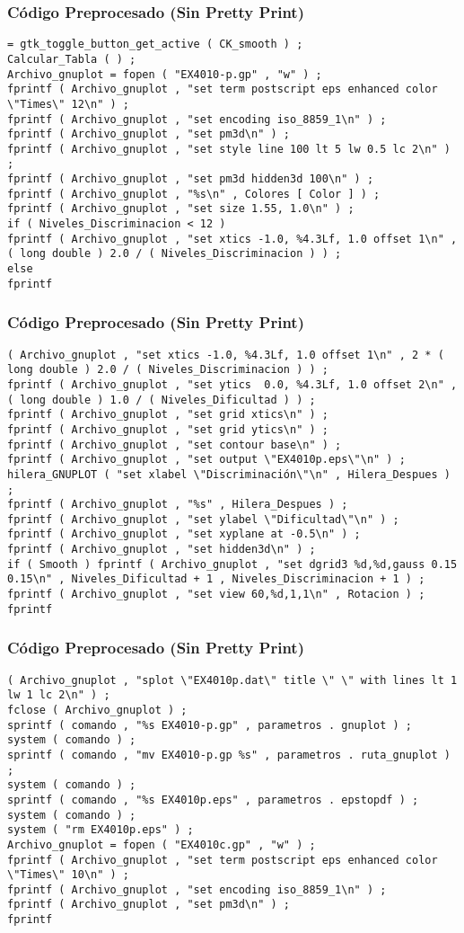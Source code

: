 \documentclass{beamer}
\begin{document}
\begin{frame}[fragile]
\frametitle{C\'odigo Preprocesado (Sin Pretty Print)}
\begin{lstlisting}[style=CStyle]
= gtk_toggle_button_get_active ( CK_smooth ) ; 
Calcular_Tabla ( ) ; 
Archivo_gnuplot = fopen ( "EX4010-p.gp" , "w" ) ; 
fprintf ( Archivo_gnuplot , "set term postscript eps enhanced color \"Times\" 12\n" ) ; 
fprintf ( Archivo_gnuplot , "set encoding iso_8859_1\n" ) ; 
fprintf ( Archivo_gnuplot , "set pm3d\n" ) ; 
fprintf ( Archivo_gnuplot , "set style line 100 lt 5 lw 0.5 lc 2\n" ) ; 
fprintf ( Archivo_gnuplot , "set pm3d hidden3d 100\n" ) ; 
fprintf ( Archivo_gnuplot , "%s\n" , Colores [ Color ] ) ; 
fprintf ( Archivo_gnuplot , "set size 1.55, 1.0\n" ) ; 
if ( Niveles_Discriminacion < 12 ) 
fprintf ( Archivo_gnuplot , "set xtics -1.0, %4.3Lf, 1.0 offset 1\n" , ( long double ) 2.0 / ( Niveles_Discriminacion ) ) ; 
else 
fprintf \end{lstlisting}
\end{frame}
\begin{frame}[fragile]
\frametitle{C\'odigo Preprocesado (Sin Pretty Print)}
\begin{lstlisting}[style=CStyle]
( Archivo_gnuplot , "set xtics -1.0, %4.3Lf, 1.0 offset 1\n" , 2 * ( long double ) 2.0 / ( Niveles_Discriminacion ) ) ; 
fprintf ( Archivo_gnuplot , "set ytics  0.0, %4.3Lf, 1.0 offset 2\n" , ( long double ) 1.0 / ( Niveles_Dificultad ) ) ; 
fprintf ( Archivo_gnuplot , "set grid xtics\n" ) ; 
fprintf ( Archivo_gnuplot , "set grid ytics\n" ) ; 
fprintf ( Archivo_gnuplot , "set contour base\n" ) ; 
fprintf ( Archivo_gnuplot , "set output \"EX4010p.eps\"\n" ) ; 
hilera_GNUPLOT ( "set xlabel \"Discriminación\"\n" , Hilera_Despues ) ; 
fprintf ( Archivo_gnuplot , "%s" , Hilera_Despues ) ; 
fprintf ( Archivo_gnuplot , "set ylabel \"Dificultad\"\n" ) ; 
fprintf ( Archivo_gnuplot , "set xyplane at -0.5\n" ) ; 
fprintf ( Archivo_gnuplot , "set hidden3d\n" ) ; 
if ( Smooth ) fprintf ( Archivo_gnuplot , "set dgrid3 %d,%d,gauss 0.15 0.15\n" , Niveles_Dificultad + 1 , Niveles_Discriminacion + 1 ) ; 
fprintf ( Archivo_gnuplot , "set view 60,%d,1,1\n" , Rotacion ) ; 
fprintf \end{lstlisting}
\end{frame}
\begin{frame}[fragile]
\frametitle{C\'odigo Preprocesado (Sin Pretty Print)}
\begin{lstlisting}[style=CStyle]
( Archivo_gnuplot , "splot \"EX4010p.dat\" title \" \" with lines lt 1 lw 1 lc 2\n" ) ; 
fclose ( Archivo_gnuplot ) ; 
sprintf ( comando , "%s EX4010-p.gp" , parametros . gnuplot ) ; 
system ( comando ) ; 
sprintf ( comando , "mv EX4010-p.gp %s" , parametros . ruta_gnuplot ) ; 
system ( comando ) ; 
sprintf ( comando , "%s EX4010p.eps" , parametros . epstopdf ) ; 
system ( comando ) ; 
system ( "rm EX4010p.eps" ) ; 
Archivo_gnuplot = fopen ( "EX4010c.gp" , "w" ) ; 
fprintf ( Archivo_gnuplot , "set term postscript eps enhanced color \"Times\" 10\n" ) ; 
fprintf ( Archivo_gnuplot , "set encoding iso_8859_1\n" ) ; 
fprintf ( Archivo_gnuplot , "set pm3d\n" ) ; 
fprintf \end{lstlisting}
\end{frame}
\end{document}
